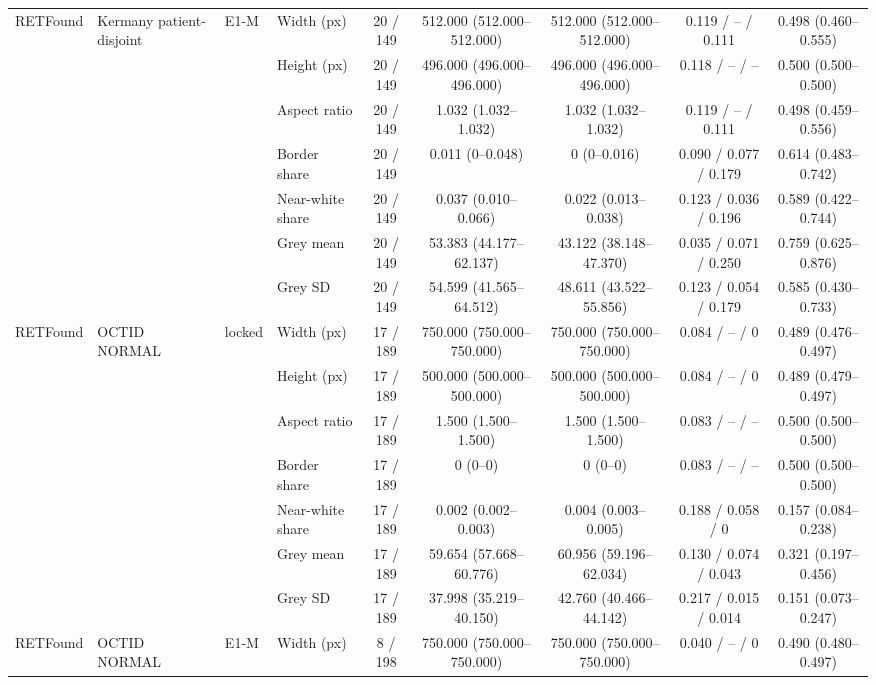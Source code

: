 \begin{longtable}{@{}llllccccc@{}}
\addlinespace[1pt]
RETFound & Kermany patient-disjoint & E1-M & Width (px) & 20 / 149 & 512.000 (512.000--512.000) & 512.000 (512.000--512.000) & 0.119 / -- / 0.111 & 0.498 (0.460--0.555) \\
 &  &  & Height (px) & 20 / 149 & 496.000 (496.000--496.000) & 496.000 (496.000--496.000) & 0.118 / -- / -- & 0.500 (0.500--0.500) \\
 &  &  & Aspect ratio & 20 / 149 & 1.032 (1.032--1.032) & 1.032 (1.032--1.032) & 0.119 / -- / 0.111 & 0.498 (0.459--0.556) \\
 &  &  & Border share & 20 / 149 & 0.011 (0--0.048) & 0 (0--0.016) & 0.090 / 0.077 / 0.179 & 0.614 (0.483--0.742) \\
 &  &  & Near-white share & 20 / 149 & 0.037 (0.010--0.066) & 0.022 (0.013--0.038) & 0.123 / 0.036 / 0.196 & 0.589 (0.422--0.744) \\
 &  &  & Grey mean & 20 / 149 & 53.383 (44.177--62.137) & 43.122 (38.148--47.370) & 0.035 / 0.071 / 0.250 & 0.759 (0.625--0.876) \\
 &  &  & Grey SD & 20 / 149 & 54.599 (41.565--64.512) & 48.611 (43.522--55.856) & 0.123 / 0.054 / 0.179 & 0.585 (0.430--0.733) \\
\addlinespace[1pt]
RETFound & OCTID NORMAL & locked & Width (px) & 17 / 189 & 750.000 (750.000--750.000) & 750.000 (750.000--750.000) & 0.084 / -- / 0 & 0.489 (0.476--0.497) \\
 &  &  & Height (px) & 17 / 189 & 500.000 (500.000--500.000) & 500.000 (500.000--500.000) & 0.084 / -- / 0 & 0.489 (0.479--0.497) \\
 &  &  & Aspect ratio & 17 / 189 & 1.500 (1.500--1.500) & 1.500 (1.500--1.500) & 0.083 / -- / -- & 0.500 (0.500--0.500) \\
 &  &  & Border share & 17 / 189 & 0 (0--0) & 0 (0--0) & 0.083 / -- / -- & 0.500 (0.500--0.500) \\
 &  &  & Near-white share & 17 / 189 & 0.002 (0.002--0.003) & 0.004 (0.003--0.005) & 0.188 / 0.058 / 0 & 0.157 (0.084--0.238) \\
 &  &  & Grey mean & 17 / 189 & 59.654 (57.668--60.776) & 60.956 (59.196--62.034) & 0.130 / 0.074 / 0.043 & 0.321 (0.197--0.456) \\
 &  &  & Grey SD & 17 / 189 & 37.998 (35.219--40.150) & 42.760 (40.466--44.142) & 0.217 / 0.015 / 0.014 & 0.151 (0.073--0.247) \\
\addlinespace[1pt]
RETFound & OCTID NORMAL & E1-M & Width (px) & 8 / 198 & 750.000 (750.000--750.000) & 750.000 (750.000--750.000) & 0.040 / -- / 0 & 0.490 (0.480--0.497) \\

\end{longtable}
